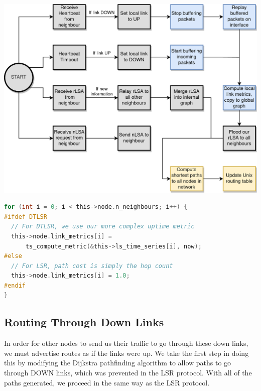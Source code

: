 \documentclass[withindex,glossary,openany]{cam-thesis}
\begin{document}
\begin{center}
\begin{minipage}{0.9\textwidth} \centering
	\includegraphics[width=1\textwidth]{flowchart_dtlsr}
	\label{fig:flowchart_dtlsr}
\end{minipage}
\end{center}

\begin{minipage}{1\textwidth} \centering
\begin{lstlisting}[language=C, label=preprocessor_switch, frame=tb, caption=Example of preprocessor switch for DTLSR modifications]
for (int i = 0; i < this->node.n_neighbours; i++) {
#ifdef DTLSR
  // For DTLSR, we use our more complex uptime metric
  this->node.link_metrics[i] =
      ts_compute_metric(&this->ls_time_series[i], now);
#else
  // For LSR, path cost is simply the hop count
  this->node.link_metrics[i] = 1.0;
#endif
}
\end{lstlisting}
\end{minipage}

\subsection{Routing Through Down Links}

In order for other nodes to send us their traffic to go through these down links, we must advertise routes as if the links were up. We take the first step in doing this by modifying the Dijkstra pathfinding algorithm to allow paths to go through DOWN links, which was prevented in the LSR protocol. With all of the paths generated, we proceed in the same way as the LSR protocol.
\end{document}
